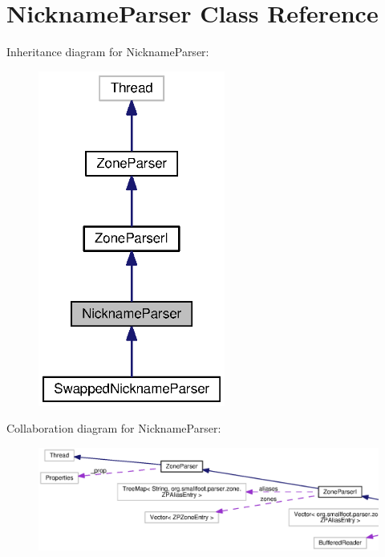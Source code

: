 \section{Nickname\+Parser Class Reference}
\label{classorg_1_1smallfoot_1_1parser_1_1zone_1_1NicknameParser}


Inheritance diagram for Nickname\+Parser\+:
\nopagebreak
\begin{figure}[H]
\begin{center}
\leavevmode
\includegraphics[width=174pt]{classorg_1_1smallfoot_1_1parser_1_1zone_1_1NicknameParser__inherit__graph}
\end{center}
\end{figure}


Collaboration diagram for Nickname\+Parser\+:
\nopagebreak
\begin{figure}[H]
\begin{center}
\leavevmode
\includegraphics[width=350pt]{classorg_1_1smallfoot_1_1parser_1_1zone_1_1NicknameParser__coll__graph}
\end{center}
\end{figure}
